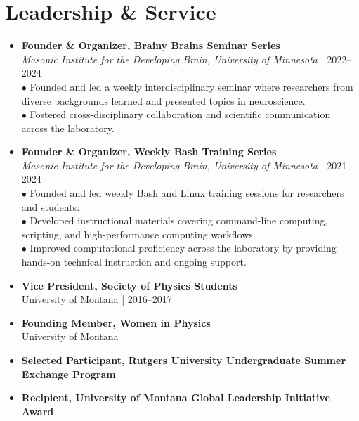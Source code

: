 \documentclass[a4paper,11pt]{article}
\begin{document}
\section{Leadership \& Service}
\begin{justify}\begin{itemize}[leftmargin=3ex, rightmargin=2ex, labelsep=1.2mm, itemsep=2.5mm, topsep=2mm]\small
\item[] \textbf{Founder \& Organizer, Brainy Brains Seminar Series} \\
\textit{Masonic Institute for the Developing Brain, University of Minnesota} | 2022--2024 \\
\hspace*{1.5em}$\bullet$ Founded and led a weekly interdisciplinary seminar where researchers from diverse backgrounds learned and presented topics in neuroscience. \\
\hspace*{1.5em}$\bullet$ Fostered cross-disciplinary collaboration and scientific communication across the laboratory.
\item[] \textbf{Founder \& Organizer, Weekly Bash Training Series} \\
\textit{Masonic Institute for the Developing Brain, University of Minnesota} | 2021--2024 \\
\hspace*{1.5em}$\bullet$ Founded and led weekly Bash and Linux training sessions for researchers and students. \\
\hspace*{1.5em}$\bullet$ Developed instructional materials covering command-line computing, scripting, and high-performance computing workflows. \\
\hspace*{1.5em}$\bullet$ Improved computational proficiency across the laboratory by providing hands-on technical instruction and ongoing support.
\item[] \textbf{Vice President, Society of Physics Students} \\
University of Montana | 2016--2017
\item[] \textbf{Founding Member, Women in Physics} \\
University of Montana
\item[] \textbf{Selected Participant, Rutgers University Undergraduate Summer Exchange Program}
\item[] \textbf{Recipient, University of Montana Global Leadership Initiative Award}
\end{itemize}\end{justify}
\vspace{-1mm}
\end{document}
